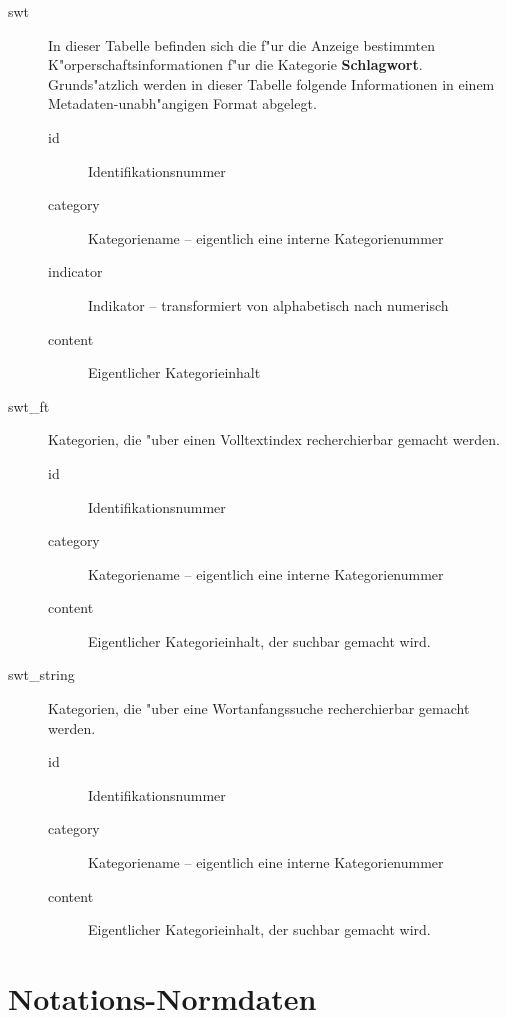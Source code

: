 \documentclass[11pt, twoside, a4paper, BCOR8mm, DIV12, bibtotoc,idxtotoc]{scrbook}
\begin{document}
\begin{itemize}
\begin{description}
\item[swt] In dieser Tabelle befinden sich die f"ur die Anzeige
  bestimmten K"orperschaftsinformationen f"ur die Kategorie
  \textbf{Schlagwort}. Grunds"atzlich werden in dieser Tabelle
  folgende Informationen in einem Metadaten-unabh"angigen Format
  abgelegt.
  \begin{description}
  \item[id] Identifikationsnummer
  \item[category] Kategoriename -- eigentlich eine interne Kategorienummer
  \item[indicator] Indikator -- transformiert von alphabetisch nach numerisch
  \item[content] Eigentlicher Kategorieinhalt
  \end{description}
\item[swt\_ft] Kategorien, die "uber einen Volltextindex recherchierbar
  gemacht werden.
  \begin{description}
  \item[id] Identifikationsnummer
  \item[category] Kategoriename -- eigentlich eine interne Kategorienummer
  \item[content] Eigentlicher Kategorieinhalt, der suchbar gemacht wird.
  \end{description}
\item[swt\_string] Kategorien, die "uber eine Wortanfangssuche
  recherchierbar gemacht werden.
  \begin{description}
  \item[id] Identifikationsnummer
  \item[category] Kategoriename -- eigentlich eine interne Kategorienummer
  \item[content] Eigentlicher Kategorieinhalt, der suchbar gemacht wird.
  \end{description}
\end{description}

\section{Notations-Normdaten}


\end{itemize}
\end{document}
